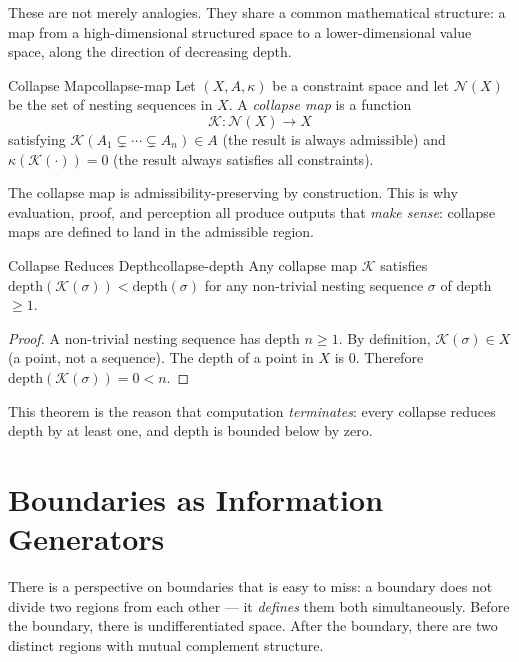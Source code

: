 
These are not merely analogies. They share a common mathematical structure:
a map from a high-dimensional structured space to a lower-dimensional
value space, along the direction of decreasing depth.

\begin{definition}{Collapse Map}{collapse-map}
  Let $(X, A, \kappa)$ be a constraint space and let $\mathcal{N}(X)$
  be the set of nesting sequences in $X$. A \emph{collapse map} is a
  function
  \[
    \mathcal{K} : \mathcal{N}(X) \longrightarrow X
  \]
  satisfying $\mathcal{K}(A_1 \subsetneq \cdots \subsetneq A_n) \in A$
  (the result is always admissible) and
  $\kappa(\mathcal{K}(\cdot)) = 0$ (the result always satisfies all constraints).
\end{definition}

The collapse map is admissibility-preserving by construction. This is why
evaluation, proof, and perception all produce outputs that \emph{make sense}:
collapse maps are defined to land in the admissible region.

\begin{theorem}{Collapse Reduces Depth}{collapse-depth}
  Any collapse map $\mathcal{K}$ satisfies
  $\mathrm{depth}(\mathcal{K}(\sigma)) < \mathrm{depth}(\sigma)$
  for any non-trivial nesting sequence $\sigma$ of depth $\geq 1$.
\end{theorem}

\begin{proof}
  A non-trivial nesting sequence has depth $n \geq 1$. By definition,
  $\mathcal{K}(\sigma) \in X$ (a point, not a sequence). The depth of a
  point in $X$ is 0. Therefore $\mathrm{depth}(\mathcal{K}(\sigma)) = 0 < n$.
\end{proof}

This theorem is the reason that computation \emph{terminates}: every collapse
reduces depth by at least one, and depth is bounded below by zero.

\section{Boundaries as Information Generators}

There is a perspective on boundaries that is easy to miss: a boundary does
not divide two regions from each other — it \emph{defines} them both
simultaneously. Before the boundary, there is undifferentiated space. After
the boundary, there are two distinct regions with mutual complement structure.

